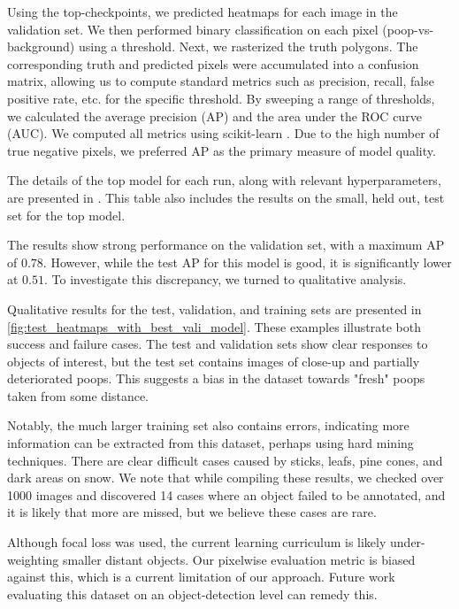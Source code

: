 Using the top-checkpoints, we predicted heatmaps for each image in the validation set.
We then performed binary classification on each pixel (poop-vs-background) using a threshold.
Next, we rasterized the truth polygons.
The corresponding truth and predicted pixels were accumulated into a confusion matrix, allowing us to
  compute standard metrics such as precision, recall, false positive rate, etc.
\cite{powers_evaluation_2011} for the specific threshold.
By sweeping a range of thresholds, we calculated the average precision (AP) and the area under the ROC curve
  (AUC).
We computed all metrics using scikit-learn \cite{scikit-learn}.
Due to the high number of true negative pixels, we preferred AP as the primary measure of model quality.
  

The details of the top model for each run, along with relevant hyperparameters, are presented in
  .
This table also includes the results on the small, held out, test set for the top model.

The results show strong performance on the validation set, with a maximum AP of $0.78$.
However, while the test AP for this model is good, it is significantly lower at $0.51$.
To investigate this discrepancy, we turned to qualitative analysis.

Qualitative results for the test, validation, and training sets are presented in
  \cref{fig:test_heatmaps_with_best_vali_model}.
These examples illustrate both success and failure cases.
The test and validation sets show clear responses to objects of interest, but the test set contains images
  of close-up and partially deteriorated poops.
This suggests a bias in the dataset towards "fresh" poops taken from some distance.

Notably, the much larger training set also contains errors, indicating more information can be extracted
  from this dataset, perhaps using hard mining techniques.
There are clear difficult cases caused by sticks, leafs, pine cones, and dark areas on snow.
We note that while compiling these results, we checked over 1000 images and discovered 14 cases where an
  object failed to be annotated, and it is likely that more are missed, but we believe these cases are rare.

Although focal loss was used, the current learning curriculum is likely under-weighting smaller distant
  objects.
Our pixelwise evaluation metric is biased against this, which is a current limitation of our approach.
Future work evaluating this dataset on an object-detection level can remedy this.

